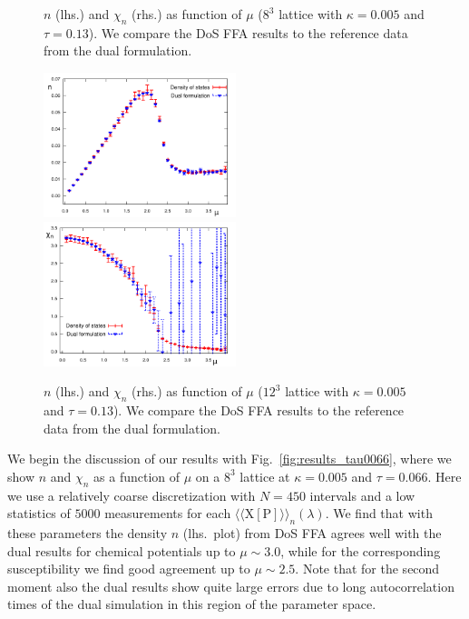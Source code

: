 \documentclass[a4paper,11pt]{article}
\begin{document}
\begin{figure}[p]
\begin{center}
\end{center}
\vspace*{-3mm}
\caption{$n$ (lhs.) and $\chi_n$ (rhs.) as function of $\mu$ ($8^3$ lattice with $\kappa=0.005$ and $\tau=0.13$).
We compare the DoS FFA results to the reference data from the dual formulation.}
\label{fig:results_8_murun}
%
\begin{center}
\hspace*{-3mm}
{\includegraphics[width=0.5\textwidth]{N_12to3_mu_run.pdf}}
{\includegraphics[width=0.5\textwidth]{Susce_12to3_mu_run.pdf}} 
\end{center}
\vspace*{-3mm}
\caption{$n$ (lhs.) and $\chi_n$ (rhs.) as function of $\mu$ ($12^3$ lattice with $\kappa=0.005$ and $\tau=0.13$).
We compare the DoS FFA results to the reference data from the dual formulation.}
\label{fig:results_12_murun}
\end{figure}

We begin the discussion of our results with Fig.~\ref{fig:results_tau0066}, where we show $n$ and $\chi_n$ as a function 
of $\mu$ on a $8^3$ lattice at $\kappa = 0.005$ and $\tau=0.066$. Here we use a relatively coarse discretization 
with $N = 450$ intervals and a low statistics of $5000$ measurements for each 
$\langle \langle \mathrm{X[P]} \rangle \rangle_{n}(\lambda)$. 
We find that with these parameters the density $n$ (lhs.\ plot) 
from DoS FFA agrees well with the dual results for chemical potentials up to $\mu \sim 3.0$, while for the corresponding 
susceptibility we find good agreement up to $\mu \sim 2.5$. Note that for the second moment also the dual results 
show quite large errors due to long autocorrelation times of the dual simulation in this region of the parameter space. 
\end{document}
